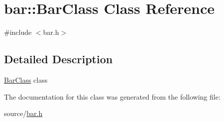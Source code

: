 \hypertarget{classbar_1_1BarClass}{}\section{bar\+:\+:Bar\+Class Class Reference}
\label{classbar_1_1BarClass}


{\ttfamily \#include $<$bar.\+h$>$}



\subsection{Detailed Description}
\hyperlink{classbar_1_1BarClass}{Bar\+Class} class 

The documentation for this class was generated from the following file\+:\begin{DoxyCompactItemize}
\item 
source/\hyperlink{bar_8h}{bar.\+h}\end{DoxyCompactItemize}
